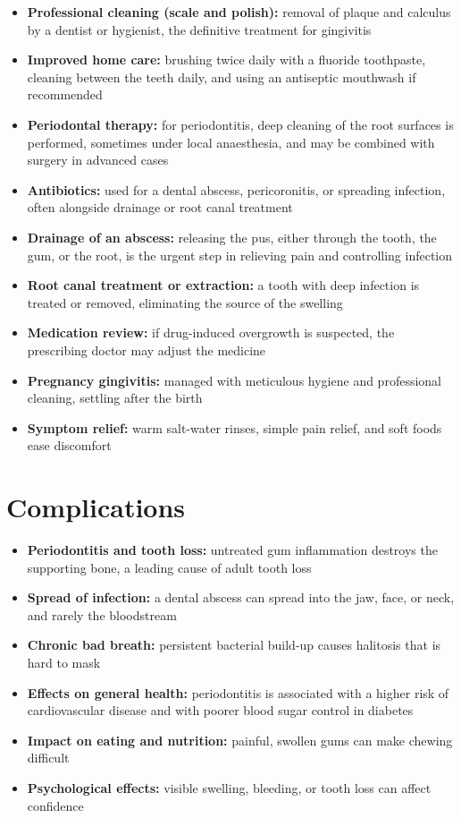 \begin{itemize}
    \item \textbf{Professional cleaning (scale and polish):} removal of plaque and calculus by a dentist or hygienist, the definitive treatment for gingivitis
    \item \textbf{Improved home care:} brushing twice daily with a fluoride toothpaste, cleaning between the teeth daily, and using an antiseptic mouthwash if recommended
    \item \textbf{Periodontal therapy:} for periodontitis, deep cleaning of the root surfaces is performed, sometimes under local anaesthesia, and may be combined with surgery in advanced cases
    \item \textbf{Antibiotics:} used for a dental abscess, pericoronitis, or spreading infection, often alongside drainage or root canal treatment
    \item \textbf{Drainage of an abscess:} releasing the pus, either through the tooth, the gum, or the root, is the urgent step in relieving pain and controlling infection
    \item \textbf{Root canal treatment or extraction:} a tooth with deep infection is treated or removed, eliminating the source of the swelling
    \item \textbf{Medication review:} if drug-induced overgrowth is suspected, the prescribing doctor may adjust the medicine
    \item \textbf{Pregnancy gingivitis:} managed with meticulous hygiene and professional cleaning, settling after the birth
    \item \textbf{Symptom relief:} warm salt-water rinses, simple pain relief, and soft foods ease discomfort
\end{itemize}

\section*{Complications}
\begin{itemize}
    \item \textbf{Periodontitis and tooth loss:} untreated gum inflammation destroys the supporting bone, a leading cause of adult tooth loss
    \item \textbf{Spread of infection:} a dental abscess can spread into the jaw, face, or neck, and rarely the bloodstream
    \item \textbf{Chronic bad breath:} persistent bacterial build-up causes halitosis that is hard to mask
    \item \textbf{Effects on general health:} periodontitis is associated with a higher risk of cardiovascular disease and with poorer blood sugar control in diabetes
    \item \textbf{Impact on eating and nutrition:} painful, swollen gums can make chewing difficult
    \item \textbf{Psychological effects:} visible swelling, bleeding, or tooth loss can affect confidence
\end{itemize}

